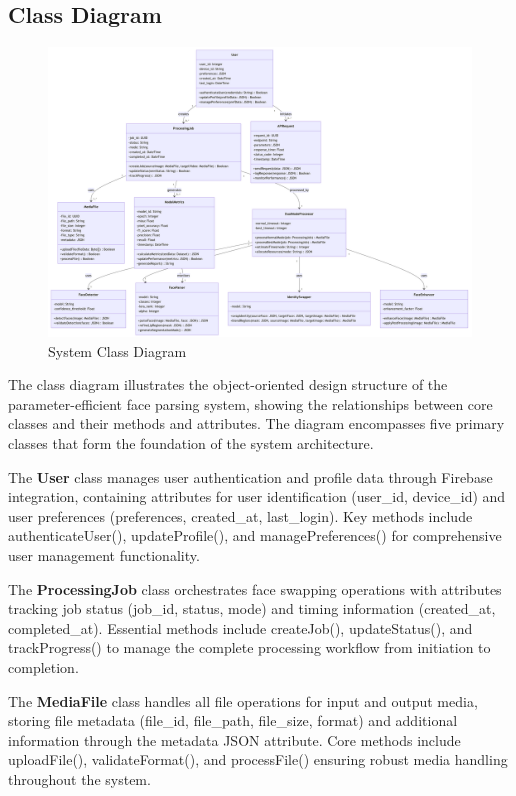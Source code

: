 \documentclass[12pt,a4paper]{report}
\begin{document}
\begin{landscape}
\subsection{Class Diagram}
\begin{figure}[H]
\centering
\includegraphics[width=1.2\textwidth]{figures/class_diagram.png}
\caption{System Class Diagram}
\label{fig:class_diagram}
\end{figure}
\end{landscape}

The class diagram illustrates the object-oriented design structure of the parameter-efficient face parsing system, showing the relationships between core classes and their methods and attributes. The diagram encompasses five primary classes that form the foundation of the system architecture.

The \textbf{User} class manages user authentication and profile data through Firebase integration, containing attributes for user identification (user\_id, device\_id) and user preferences (preferences, created\_at, last\_login). Key methods include authenticateUser(), updateProfile(), and managePreferences() for comprehensive user management functionality.

The \textbf{ProcessingJob} class orchestrates face swapping operations with attributes tracking job status (job\_id, status, mode) and timing information (created\_at, completed\_at). Essential methods include createJob(), updateStatus(), and trackProgress() to manage the complete processing workflow from initiation to completion.

The \textbf{MediaFile} class handles all file operations for input and output media, storing file metadata (file\_id, file\_path, file\_size, format) and additional information through the metadata JSON attribute. Core methods include uploadFile(), validateFormat(), and processFile() ensuring robust media handling throughout the system.
\end{document}
